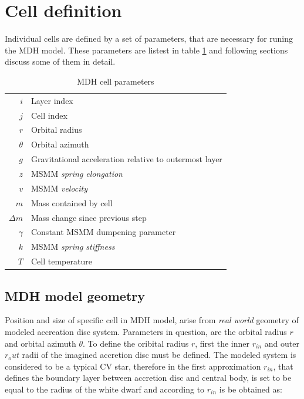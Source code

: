 \section{Cell definition}
Individual cells are defined by a set of parameters, that are necessary for runing the  MDH model. These parameters are listest in table \ref{table:mdh_cell_parameters} and following sections discuss some of them in detail.

\vspace{5mm}

\begin{table}[h]
\begin{center}
\begin{tabular}{r|l}
$i$			& Layer index \\
$j$			& Cell index \\
$r$			& Orbital radius \\
$\theta$		& Orbital azimuth \\ 
$g$			& Gravitational acceleration relative to outermost layer \\
$z$			& MSMM \emph{spring elongation}  \\
$v$			& MSMM \emph{velocity} \\
$m$			& Mass contained by cell \\
$\Delta m$ 	& Mass change since previous step \\
$\gamma$		& Constant MSMM dumpening parameter \\
$k$			& MSMM \emph{spring stiffness} \\
$T$			& Cell temperature
\end{tabular}
\caption{MDH cell parameters}
\label{table:mdh_cell_parameters}
\end{center}
\end{table}

\subsection{MDH model geometry}
Position and size of specific cell in MDH model, arise from \emph{real world} geometry of modeled accreation disc system. Parameters in question, are the orbital radius $r$ and orbital azimuth $\theta$. To define the oribital radius $r$, first the inner $r_{in}$ and outer $r_out$ radii of the imagined accretion disc must be defined. The modeled system is considered to be a typical CV star, therefore in the first approximation $r_{in}$, that defines the boundary layer between accretion disc and central body, is set to be equal to the radius of the white dwarf and according to \cite{shapiro1983} $r_{in}$ is be obtained as:

